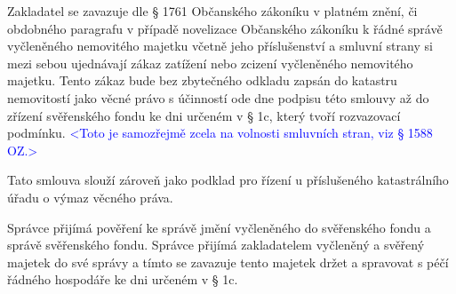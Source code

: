\documentclass[parskip=half]{scrreprt}
\begin{document}
\begin{contract}


Zakladatel se zavazuje dle § 1761 Občanského zákoníku v platném znění, či obdobného paragrafu v případě novelizace Občanského zákoníku k řádné správě vyčleněného nemovitého majetku včetně jeho příslušenství a smluvní strany si mezi sebou ujednávají zákaz zatížení nebo zcizení vyčleněného nemovitého majetku. Tento zákaz bude bez zbytečného odkladu zapsán do katastru nemovitostí jako věcné právo s účinností ode dne podpisu této smlouvy až do zřízení svěřenského fondu ke dni určeném v § 1c, který tvoří rozvazovací podmínku. \textcolor{blue}{<Toto je samozřejmě zcela na volnosti smluvních stran, viz § 1588 OZ.>}

Tato smlouva slouží zároveň jako podklad pro řízení u příslušeného katastrálního úřadu o výmaz věcného práva.



Správce přijímá pověření ke správě jmění vyčleněného do svěřenského fondu a správě svěřenského fondu. Správce přijímá zakladatelem vyčleněný a svěřený majetek do své správy a tímto se zavazuje tento majetek držet a spravovat s péčí řádného hospodáře ke dni určeném v § 1c.


\end{contract}
\end{document}
